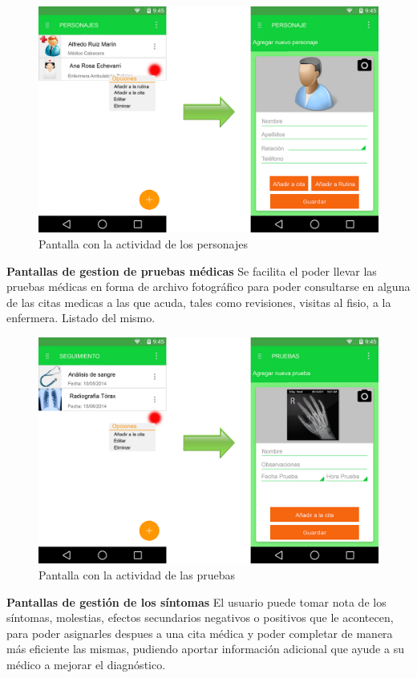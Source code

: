 \documentclass[../pfc.tex]{subfiles}
\begin{document}
			
			\begin{figure}
				\centering
				\includegraphics[width=0.7\linewidth]{../images/personajes}
				\caption{Pantalla con la actividad de los personajes}
				\label{fig:personajes}
			\end{figure}
			
			
			\textbf{Pantallas de gestion de pruebas médicas}
			Se facilita el poder llevar las pruebas médicas en forma de archivo fotográfico para poder consultarse en alguna de las citas medicas a las que acuda, tales como revisiones, visitas al fisio, a la enfermera. Listado del mismo.
			
			\begin{figure}
				\centering
				\includegraphics[width=0.7\linewidth]{../images/pruebas}
				\caption{Pantalla con la actividad de las pruebas}
				\label{fig:pruebas}
			\end{figure}
			
			
			\textbf{Pantallas de gestión de los síntomas}
			El usuario puede tomar nota de los síntomas, molestias, efectos secundarios negativos o positivos que le acontecen, para poder asignarles despues a una cita médica y poder completar de manera más eficiente las mismas, pudiendo aportar información adicional que ayude a su médico a mejorar el diagnóstico.
			
\end{document}
